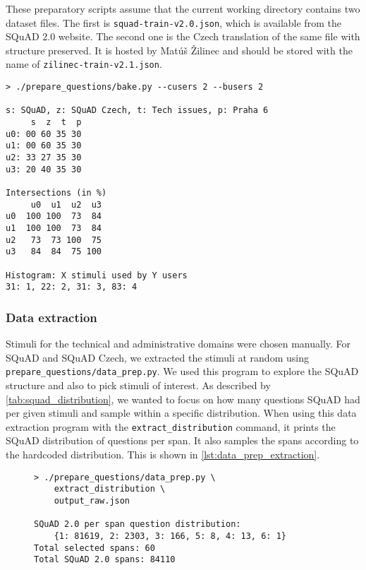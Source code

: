 These preparatory scripts assume that the current working directory contains two dataset files. The first is \texttt{squad-train-v2.0.json}, which is available from the SQuAD 2.0 website. The second one is the Czech translation of the same file with structure preserved. It is hosted by Matúš Žilinec and should be stored with the name of \texttt{zilinec-train-v2.1.json}.

\pagebreak
\begin{lstlisting}[language=none,caption={Example output of baked queue generator}, label={lst:bake_example}]
> ./prepare_questions/bake.py --cusers 2 --busers 2

s: SQuAD, z: SQuAD Czech, t: Tech issues, p: Praha 6
     s  z  t  p
u0: 00 60 35 30
u1: 00 60 35 30
u2: 33 27 35 30
u3: 20 40 35 30

Intersections (in %)
     u0  u1  u2  u3
u0  100 100  73  84
u1  100 100  73  84
u2   73  73 100  75
u3   84  84  75 100

Histogram: X stimuli used by Y users
31: 1, 22: 2, 31: 3, 83: 4
\end{lstlisting}

\subsubsection{Data extraction}

Stimuli for the technical and administrative domains were chosen manually. For SQuAD and SQuAD Czech, we extracted the stimuli at random using \texttt{prepare\_questions/data\_prep.py}. We used this program to explore the SQuAD structure and also to pick stimuli of interest. As described by \cref{tab:squad_distribution}, we wanted to focus on how many questions SQuAD had per given stimuli and sample within a specific distribution. When using this data extraction program with the \texttt{extract\_distribution} command, it prints the SQuAD distribution of questions per span. It also samples the spans according to the hardcoded distribution. This is shown in \cref{lst:data_prep_extraction}.

\begin{figure}[h]
\begin{lstlisting}[language=none,caption={Output of SQuAD data extraction tool}, label={lst:data_prep_extraction}, stringstyle=\ttfamily, showstringspaces=false]
> ./prepare_questions/data_prep.py \ 
    extract_distribution \ 
    output_raw.json
    
SQuAD 2.0 per span question distribution:
    {1: 81619, 2: 2303, 3: 166, 5: 8, 4: 13, 6: 1}
Total selected spans: 60
Total SQuAD 2.0 spans: 84110
\end{lstlisting}
\end{figure}


